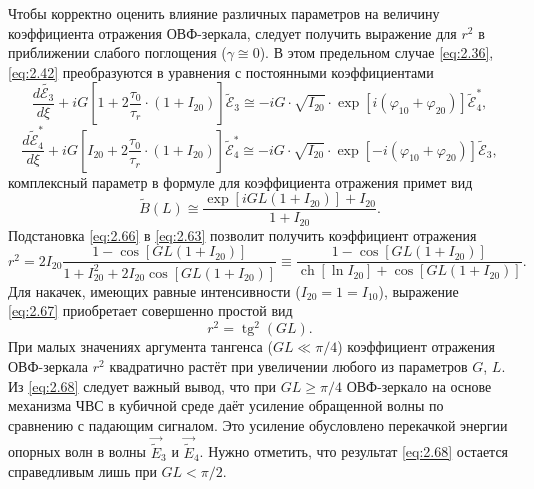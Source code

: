 Чтобы корректно оценить влияние различных параметров на величину
коэффициента отражения ОВФ-зеркала, следует получить выражение для $r^2$ в
приближении слабого поглощения ($\gamma \cong 0$). В этом предельном случае \eqref{eq:2.36}, \eqref{eq:2.42} преобразуются в уравнения с постоянными коэффициентами
\begin{equation}
	\label{eq:2.64}
	\frac{d \tilde{\mathcal{E}_{3}}}{d \xi}+i G\left[1+2 \frac{\tau_{0}}{\tau_{r}} \cdot\left(1+I_{20}\right)\right] \tilde{\mathcal{E}}_{3} \cong-i G \cdot \sqrt{I_{20}} \cdot \exp \left[i\left(\varphi_{10}+\varphi_{20}\right)\right] \tilde{\mathcal{E}}_{4}^*,
\end{equation}
\begin{equation}
	\label{eq:2.65}
	\frac{d \tilde{\mathcal{E}}_{4}^*}{d \xi}+i G\left[I_{20}+2 \frac{\tau_{0}}{\tau_{r}} \cdot\left(1+I_{20}\right)\right] \tilde{\mathcal{E}}_{4}^* \cong-i G \cdot \sqrt{I_{20}} \cdot \exp \left[-i\left(\varphi_{10}+\varphi_{20}\right)\right] \tilde{\mathcal{E}}_{3},
\end{equation}
комплексный параметр в формуле для коэффициента отражения примет вид
\begin{equation}
	\label{eq:2.66}
	\tilde{B}(L) \cong \frac{\exp \left[i G L\left(1+I_{20}\right)\right]+I_{20}}{1+I_{20}}.
\end{equation}
Подстановка \eqref{eq:2.66} в \eqref{eq:2.63} позволит получить коэффициент отражения 
\begin{equation}
	\label{eq:2.67}
	r^{2}=2 I_{20} \frac{1-\cos \left[G L\left(1+I_{20}\right)\right]}{1+I_{20}^{2}+2 I_{20} \cos \left[G L\left(1+I_{20}\right)\right]} \equiv \frac{1-\cos \left[G L\left(1+I_{20}\right)\right]}{\operatorname{ch}\left[\ln I_{20}\right]+\cos \left[G L\left(1+I_{20}\right)\right]}.
\end{equation}
Для накачек, имеющих равные интенсивности ($I_{20}=1=I_{10}$), выражение \eqref{eq:2.67} приобретает совершенно простой вид
\begin{equation}
	\label{eq:2.68}
	r^{2}=\operatorname{tg}^{2}(G L).
\end{equation}
При малых значениях аргумента тангенса ($GL \ll \pi/4$) коэффициент отражения ОВФ-зеркала $r^2$ квадратично растёт при увеличении любого из параметров $G$, $L$. Из \eqref{eq:2.68} следует важный вывод, что при $GL \geq \pi/4$ ОВФ-зеркало на основе механизма ЧВС в кубичной среде даёт усиление обращенной
волны по сравнению с падающим сигналом. Это усиление обусловлено перекачкой энергии опорных волн в волны $\vec{\tilde{E}}_3$ и $\vec{\tilde{E}}_4$. Нужно отметить, что результат \eqref{eq:2.68} остается справедливым лишь при  $GL < \pi/2$.